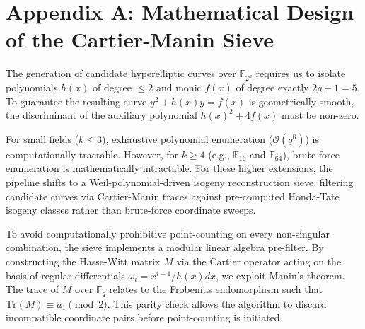 \documentclass[letterpaper, 11pt]{article}
\begin{document}
\appendix

\section{Appendix A: Mathematical Design of the Cartier-Manin Sieve}
The generation of candidate hyperelliptic curves over $\mathbb{F}_{2^k}$ requires us to isolate polynomials $h(x)$ of degree $\le 2$ and monic $f(x)$ of degree exactly $2g+1=5$. To guarantee the resulting curve $y^2 + h(x)y = f(x)$ is geometrically smooth, the discriminant of the auxiliary polynomial $h(x)^2 + 4f(x)$ must be non-zero. 

For small fields ($k \le 3$), exhaustive polynomial enumeration ($\mathcal{O}(q^8)$) is computationally tractable. However, for $k \ge 4$ (e.g., $\mathbb{F}_{16}$ and $\mathbb{F}_{64}$), brute-force enumeration is mathematically intractable. For these higher extensions, the pipeline shifts to a Weil-polynomial-driven isogeny reconstruction sieve, filtering candidate curves via Cartier-Manin traces against pre-computed Honda-Tate isogeny classes rather than brute-force coordinate sweeps.

To avoid computationally prohibitive point-counting on every non-singular combination, the sieve implements a modular linear algebra pre-filter. By constructing the Hasse-Witt matrix $M$ via the Cartier operator acting on the basis of regular differentials $\omega_i = x^{i-1}/h(x) dx$, we exploit Manin's theorem. The trace of $M$ over $\mathbb{F}_q$ relates to the Frobenius endomorphism such that $\text{Tr}(M) \equiv a_1 \pmod 2$. This parity check allows the algorithm to discard incompatible coordinate pairs before point-counting is initiated. 
\end{document}
